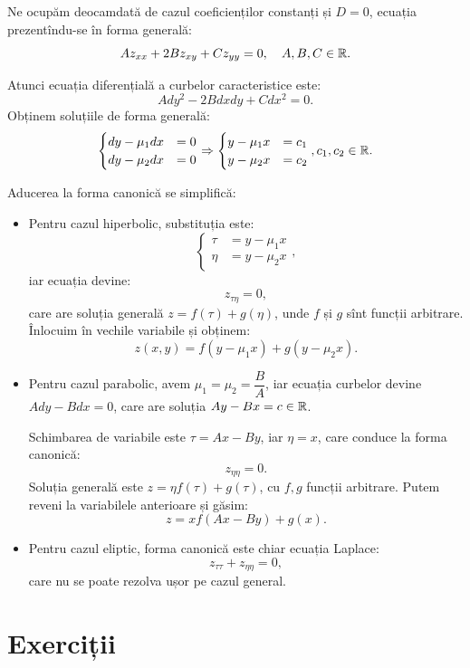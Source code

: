 Ne ocupăm deocamdată de cazul coeficienților constanți și $ D = 0 $, ecuația prezentîndu-se
în forma generală:
\[
  A z_{xx} + 2B z_{xy} + C z_{yy} = 0, \quad A, B, C \in \mathbb{R}.
\]

Atunci ecuația diferențială a curbelor caracteristice este:
\[
  Ady^2 - 2Bdxdy + Cdx^2 = 0.
\]
Obținem soluțiile de forma generală:
\[
  \begin{cases}
    dy - \mu_1 dx &= 0 \\
    dy - \mu_2 dx &= 0
  \end{cases} \Rightarrow
  \begin{cases}
    y - \mu_1 x &= c_1 \\
    y - \mu_2 x &= c_2
  \end{cases}, c_1, c_2 \in \mathbb{R}.
\]

Aducerea la forma canonică se simplifică:
\begin{itemize}
\item Pentru cazul hiperbolic, substituția este:
  \[
    \begin{cases}
      \tau &= y - \mu_1 x \\
      \eta &= y - \mu_2 x
    \end{cases},
  \]
  iar ecuația devine:
  \[
    z_{\tau\eta} = 0,
  \]
  care are soluția generală $ z = f(\tau) + g(\eta) $, unde $ f $ și $ g $ sînt
  funcții arbitrare. Înlocuim în vechile variabile și obținem:
  \[
    z(x, y) = f(y - \mu_1 x) + g(y - \mu_2 x).
  \]
\item Pentru cazul parabolic, avem $ \mu_1 = \mu_2 = \dfrac{B}{A} $, iar ecuația
  curbelor devine $ Ady - Bdx = 0 $, care are soluția $ Ay - Bx = c \in \mathbb{R} $.

  Schimbarea de variabile este $ \tau = Ax - By $, iar $ \eta = x $, care conduce
  la forma canonică:
  \[
    z_{\eta\eta} = 0.
  \]
  Soluția generală este $ z = \eta f(\tau) + g(\tau) $, cu $ f, g $ funcții arbitrare.
  Putem reveni la variabilele anterioare și găsim:
  \[
    z = x f(Ax - By) + g(x).
  \]
\item Pentru cazul eliptic, forma canonică este chiar ecuația Laplace:
  \[
    z_{\tau\tau} + z_{\eta\eta} = 0,
  \]
  care nu se poate rezolva ușor pe cazul general.
\end{itemize}


\section{Exerciții}

